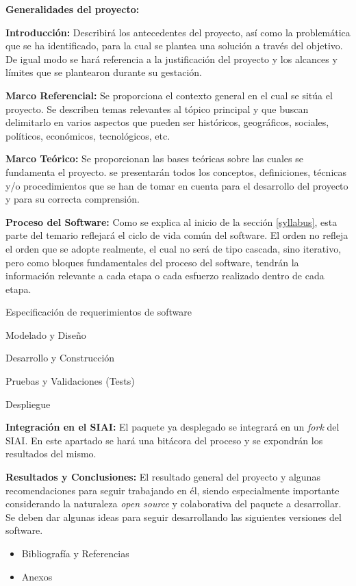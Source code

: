 \begin{tcolorbox}[breakable]
    \begin{syllabus}
        \item \textbf{Generalidades del proyecto:}
        \begin{syllabus}
            \item \textbf{Introducción:} Describirá los antecedentes del proyecto, así como la problemática que se ha identificado, para la cual se plantea una solución a través del objetivo. De igual modo se hará referencia a la justificación del proyecto y los alcances y límites que se plantearon durante su gestación.
            \item \textbf{Marco Referencial:} Se proporciona el contexto general en el cual se sitúa el proyecto. Se describen temas relevantes al tópico principal y que buscan delimitarlo en varios aspectos que pueden ser históricos, geográficos, sociales, políticos, económicos, tecnológicos, etc.
            \item \textbf{Marco Teórico:} Se proporcionan las bases teóricas sobre las cuales se fundamenta el proyecto. se presentarán todos los conceptos, definiciones, técnicas y/o procedimientos que se han de tomar en cuenta para el desarrollo del proyecto y para su correcta comprensión.
        \end{syllabus}
        \item \textbf{Proceso del Software:} Como se explica al inicio de la sección \ref{syllabus}, esta parte del temario reflejará el ciclo de vida común del software. El orden no refleja el orden que se adopte realmente, el cual no será de tipo cascada, sino iterativo, pero como bloques fundamentales del proceso del software, tendrán la información relevante a cada etapa o cada esfuerzo realizado dentro de cada etapa.
        \begin{syllabus}
            \item Especificación de requerimientos de software \cite[104]{pressmanSoftwareEngineeringPractitioner2010}
            \item Modelado y Diseño
            \item Desarrollo y Construcción
            \item Pruebas y Validaciones (Tests)
            \item Despliegue
        \end{syllabus}
        \item \textbf{Integración en el SIAI:} El paquete ya desplegado se integrará en un \textit{fork} del SIAI. En este apartado se hará una bitácora del proceso y se expondrán los resultados del mismo.
        \item \textbf{Resultados y Conclusiones:} El resultado general del proyecto y algunas recomendaciones para seguir trabajando en él, siendo especialmente importante considerando la naturaleza \textit{open source} y colaborativa del paquete a desarrollar. Se deben dar algunas ideas para seguir desarrollando las siguientes versiones del software.
    \end{syllabus}

    \begin{itemize}
        \item Bibliografía y Referencias
        \item Anexos
    \end{itemize}
\end{tcolorbox}
